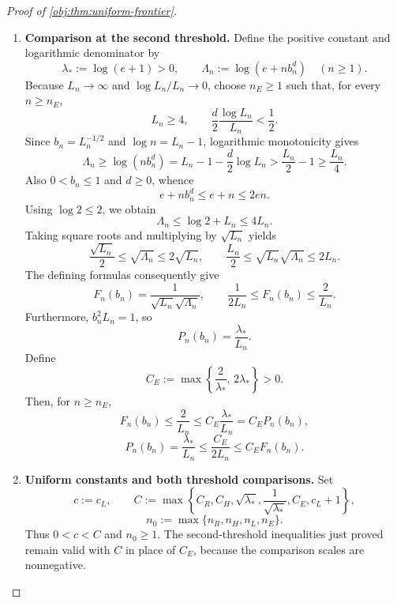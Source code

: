 \documentclass[11pt]{article}
\begin{document}
\begin{proof}[Proof of \cref{obj:thm:uniform-frontier}]
\begin{enumerate}
Define
\[
c_L:=c_{\mathrm w}\tau>0,
\qquad
n_L:=\max\{n_{\mathrm w},1\}.
\]
For \(n\ge n_L\), the inequalities \(\tau\le1/5\) and \(\tau\le1-2\alpha-\tau\), together with \(\delta_{n,\sigma}\ge0\), give
\[
c_L\rho_{n,\sigma}=\tau\delta_{n,\sigma}
\le\frac{\delta_{n,\sigma}}5\le R_n(\sigma),
\]
\[
c_L\rho_{n,\sigma}=\tau\delta_{n,\sigma}
\le(1-2\alpha-\tau)\delta_{n,\sigma}\le H_n(\sigma).
\]
We have obtained, uniformly over the path spaces and allowed error scales,
\[
c_L\rho_{n,\sigma}\le R_n(\sigma),
\qquad
c_L\rho_{n,\sigma}\le H_n(\sigma)
\qquad(n\ge n_L).
\]

\item \textbf{Comparison at the second threshold.}
Define the positive constant and logarithmic denominator by
\[
\lambda_*:=\log(e+1)>0,
\qquad
\Lambda_n:=\log(e+n b_n^d)\quad(n\ge1).
\]
Because \(L_n\to\infty\) and \(\log L_n/L_n\to0\), choose \(n_E\ge1\) such that, for every \(n\ge n_E\),
\[
L_n\ge4,
\qquad
\frac d2\frac{\log L_n}{L_n}<\frac12.
\]
Since \(b_n=L_n^{-1/2}\) and \(\log n=L_n-1\), logarithmic monotonicity gives
\[
\Lambda_n
\ge\log(n b_n^d)
=L_n-1-\frac d2\log L_n
>\frac{L_n}{2}-1
\ge\frac{L_n}{4}.
\]
Also \(0<b_n\le1\) and \(d\ge0\), whence
\[
e+n b_n^d\le e+n\le2en.
\]
Using \(\log2\le2\), we obtain
\[
\Lambda_n\le\log2+L_n\le4L_n.
\]
Taking square roots and multiplying by \(\sqrt{L_n}\) yields
\[
\frac{\sqrt{L_n}}2\le\sqrt{\Lambda_n}\le2\sqrt{L_n},
\qquad
\frac{L_n}{2}
\le\sqrt{L_n}\sqrt{\Lambda_n}
\le2L_n.
\]
The defining formulas consequently give
\[
F_n(b_n)=\frac1{\sqrt{L_n}\sqrt{\Lambda_n}},
\qquad
\frac1{2L_n}\le F_n(b_n)\le\frac2{L_n}.
\]
Furthermore, \(b_n^2L_n=1\), so
\[
P_n(b_n)=\frac{\lambda_*}{L_n}.
\]
Define
\[
C_E:=\max\left\{\frac2{\lambda_*},\,2\lambda_*\right\}>0.
\]
Then, for \(n\ge n_E\),
\[
F_n(b_n)
\le\frac2{L_n}
\le C_E\frac{\lambda_*}{L_n}
=C_EP_n(b_n),
\]
\[
P_n(b_n)
=\frac{\lambda_*}{L_n}
\le\frac{C_E}{2L_n}
\le C_EF_n(b_n).
\]

\item \textbf{Uniform constants and both threshold comparisons.}
Set
\[
c:=c_L,
\qquad
C:=\max\left\{
C_R,C_H,\sqrt{\lambda_*},\frac1{\sqrt{\lambda_*}},
C_E,c_L+1
\right\},
\]
\[
n_0:=\max\{n_R,n_H,n_L,n_E\}.
\]
Thus \(0<c<C\) and \(n_0\ge1\). The second-threshold inequalities just proved remain valid with \(C\) in place of \(C_E\), because the comparison scales are nonnegative.


\end{enumerate}
\end{proof}
\end{document}
